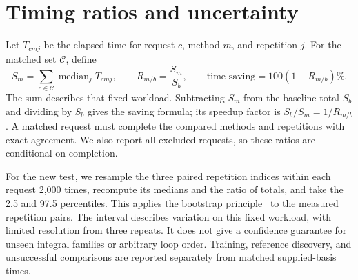 \section{Timing ratios and uncertainty}
\label{app:statistics}
Let $T_{cmj}$ be the elapsed time for request $c$, method $m$, and repetition $j$. For the matched set $\mathcal C$, define
\begin{equation}
 S_m=\sum_{c\in\mathcal C}\operatorname{median}_j T_{cmj},\qquad
 R_{m/b}=\frac{S_m}{S_b},\qquad
 \text{time saving}=100(1-R_{m/b})\%.
 \label{eq:timing-new}
\end{equation}
The sum describes that fixed workload. Subtracting $S_m$ from the baseline total $S_b$ and dividing by $S_b$ gives the saving formula; its speedup factor is $S_b/S_m=1/R_{m/b}$. A matched request must complete the compared methods and repetitions with exact agreement. We also report all excluded requests, so these ratios are conditional on completion.

For the new test, we resample the three paired repetition indices within each request 2,000 times, recompute its medians and the ratio of totals, and take the 2.5 and 97.5 percentiles. This applies the bootstrap principle~\cite{Efron1979} to the measured repetition pairs. The interval describes variation on this fixed workload, with limited resolution from three repeats. It does not give a confidence guarantee for unseen integral families or arbitrary loop order. Training, reference discovery, and unsuccessful comparisons are reported separately from matched supplied-basis times.
